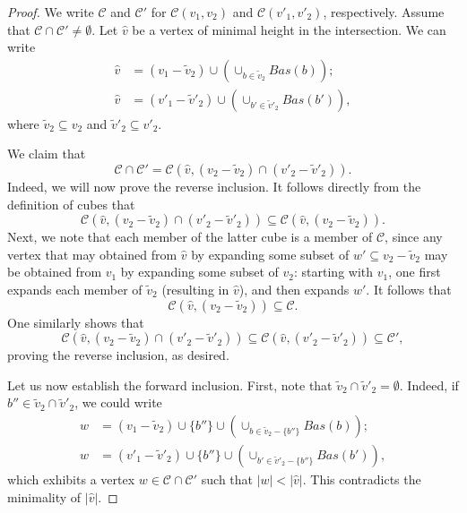 \documentclass{amsart}
\newtheorem{standing assumption}[theorem]{Standing Assumption}
\begin{document}
\begin{proof}
We write $\mathcal{C}$ and $\mathcal{C}'$ for $\mathcal{C}(v_{1},v_{2})$ and $\mathcal{C}(v'_{1},v'_{2})$, respectively. 
Assume that $\mathcal{C} \cap \mathcal{C}' \neq \emptyset$. Let $
\hat{v}$ be a vertex of minimal height in the intersection. We can write
\begin{align*}
\hat{v} &= (v_{1} - \tilde{v}_{2}) \cup \left( \cup_{b \in \tilde{v}_{2}} Bas(b) \right); \\
\hat{v} &= (v'_{1} - \tilde{v}'_{2}) \cup \left( \cup_{b' \in \tilde{v}'_{2}} Bas(b') \right),
\end{align*}
where $\tilde{v}_{2} \subseteq v_{2}$ and $\tilde{v}'_{2} \subseteq v'_{2}$.

We claim that 
\[ \mathcal{C} \cap \mathcal{C}' = \mathcal{C}\left( \hat{v}, \left( v_{2} - \tilde{v}_{2} \right) \cap \left( v'_{2} - \tilde{v}'_{2} \right)\right). \]
Indeed, we will now prove the reverse inclusion.
It follows directly from the definition of cubes that
\[ \mathcal{C}\left( \hat{v}, \left( v_{2} - \tilde{v}_{2} \right) \cap \left( v'_{2} - \tilde{v}'_{2} \right)\right) \subseteq \mathcal{C}\left( \hat{v}, \left( v_{2} - \tilde{v}_{2} \right)\right).\] Next, we note that each member of the latter cube is a member of $\mathcal{C}$, since any vertex that may obtained  from $\hat{v}$ by expanding some subset of $w' \subseteq v_{2} - \tilde{v}_{2}$ may be 
obtained from $v_{1}$ by expanding some subset of $v_{2}$: starting with $v_{1}$, one first expands each member of $\tilde{v}_{2}$ (resulting in $\hat{v}$), and then expands $w'$. It follows that
\[ \mathcal{C}\left( \hat{v}, \left( v_{2} - \tilde{v}_{2} \right)\right) \subseteq \mathcal{C}. \]
One similarly shows that
\[ \mathcal{C}\left( \hat{v}, \left( v_{2} - \tilde{v}_{2} \right) \cap \left( v'_{2} - \tilde{v}'_{2} \right)\right) 
\subseteq \mathcal{C}\left( \hat{v}, \left( v'_{2} - \tilde{v}'_{2} \right)\right) \subseteq \mathcal{C}', \]
proving the reverse inclusion, as desired.

Let us now establish the forward inclusion. First, note that $\tilde{v}_{2} \cap \tilde{v}'_{2} = \emptyset$. Indeed, if $b'' \in 
\tilde{v}_{2} \cap \tilde{v}'_{2}$, we could write
\begin{align*}
w &= \left( v_{1} - \tilde{v}_{2} \right) \cup \{ b'' \} \cup \left( \cup_{b \in \tilde{v}_{2} - \{ b'' \}} Bas(b) \right); \\
w &= \left(v'_{1} - \tilde{v}'_{2} \right) \cup \{ b'' \} \cup \left( \cup_{b' \in \tilde{v}'_{2} - \{ b'' \}} Bas(b') \right),
\end{align*}
which exhibits a vertex $w \in \mathcal{C} \cap \mathcal{C}'$ such that $|w| < |\hat{v}|$. This contradicts the minimality of $|\hat{v}|$. 


\end{proof}
\end{document}
